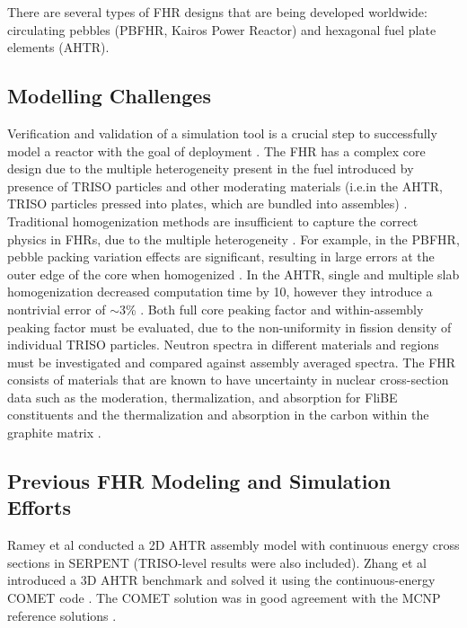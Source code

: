There are several types of \gls{FHR} designs that are being developed worldwide: 
circulating pebbles (\gls{PBFHR}, Kairos Power Reactor) and hexagonal fuel plate elements (\gls{AHTR}). 


\subsection{Modelling Challenges}
Verification and validation of a simulation tool is a crucial step to successfully 
model a reactor with the goal of deployment \cite{rahnema_phenomena_2019}. 
The \gls{FHR} has a complex core design due to the multiple heterogeneity present 
in the fuel introduced by presence of \gls{TRISO} particles and other moderating 
materials (i.e.in the \gls{AHTR}, \gls{TRISO} particles pressed into plates, which 
are bundled into assembles) \cite{ramey_monte_2018,rahnema_phenomena_2019}.
Traditional homogenization methods are insufficient to capture the correct physics 
in \glspl{FHR}, due to the multiple heterogeneity \cite{ramey_monte_2018}. 
For example, in the \gls{PBFHR}, pebble packing variation effects are significant, 
resulting in large errors at the outer edge of the core when homogenized 
\cite{rahnema_phenomena_2019}. 
In the \gls{AHTR}, single and multiple slab homogenization decreased computation time 
by 10, however they introduce a nontrivial error of $\sim$3\%
\cite{ramey_monte_2018,cisneros_neutronics_2012}.
Both full core peaking factor and within-assembly peaking factor must be evaluated, 
due to the non-uniformity in fission density of individual \gls{TRISO} particles. 
Neutron spectra in different materials and regions must be investigated and compared 
against assembly averaged spectra. 
The \gls{FHR} consists of materials that are known to have uncertainty 
in nuclear cross-section data such as the moderation, thermalization, and absorption 
for FliBE constituents and the thermalization and absorption 
in the carbon within the graphite matrix \cite{rahnema_phenomena_2019}. 
 
\subsection{Previous \gls{FHR} Modeling and Simulation Efforts}
Ramey et al \cite{ramey_monte_2018} conducted a 2D \gls{AHTR} assembly model with 
continuous energy cross sections in SERPENT (\gls{TRISO}-level results were also 
included). 
Zhang et al introduced a 3D \gls{AHTR} benchmark \cite{zhang_stylized_2018}
and solved it using the continuous-energy COMET code 
\cite{zhang_continuous-energy_2018}. 
The COMET solution was in good agreement with the \gls{MCNP} reference solutions
\cite{zhang_continuous-energy_2018}. 


